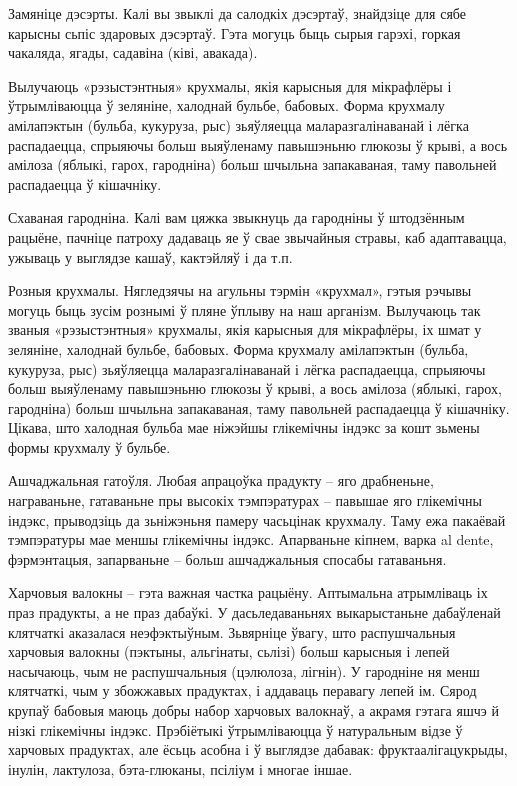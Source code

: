 Замяніце дэсэрты.
Калі вы звыклі да салодкіх дэсэртаў, знайдзіце для сябе карысны сьпіс здаровых дэсэртаў. Гэта могуць быць сырыя гарэхі, горкая чакаляда, ягады, садавіна (ківі, авакада).

Вылучаюць «рэзыстэнтныя» крухмалы, якія карысныя для мікрафлёры і ўтрымліваюцца ў зеляніне, халоднай бульбе, бабовых. Форма крухмалу амілапэктын (бульба, кукуруза, рыс) зьяўляецца маларазгалінаванай і лёгка распадаецца, спрыяючы больш выяўленаму павышэньню глюкозы ў крыві, а вось амілоза (яблыкі, гарох, гародніна) больш шчыльна запакаваная, таму павольней распадаецца ў кішачніку.

Схаваная гародніна.
Калі вам цяжка звыкнуць да гародніны ў штодзённым рацыёне, пачніце патроху дадаваць яе ў свае звычайныя стравы, каб адаптавацца, ужываць у выглядзе кашаў, кактэйляў і да т.п.

Розныя крухмалы.
Нягледзячы на агульны тэрмін «крухмал», гэтыя рэчывы могуць быць зусім рознымі ў пляне ўплыву на наш арганізм. Вылучаюць так званыя «рэзыстэнтныя» крухмалы, якія карысныя для мікрафлёры, іх шмат у зеляніне, халоднай бульбе, бабовых. Форма крухмалу амілапэктын (бульба, кукуруза, рыс) зьяўляецца маларазгалінаванай і лёгка распадаецца, спрыяючы больш выяўленаму павышэньню глюкозы ў крыві, а вось амілоза (яблыкі, гарох, гародніна) больш шчыльна запакаваная, таму павольней распадаецца ў кішачніку. Цікава, што халодная бульба мае ніжэйшы глікемічны індэкс за кошт зьмены формы крухмалу ў бульбе.

Ашчаджальная гатоўля.
Любая апрацоўка прадукту – яго драбненьне, награваньне, гатаваньне пры высокіх тэмпэратурах – павышае яго глікемічны індэкс, прыводзіць да зьніжэньня памеру часьцінак крухмалу. Таму ежа пакаёвай тэмпэратуры мае меншы глікемічны індэкс. Апарваньне кіпнем, варка al dente, фэрмэнтацыя, запарваньне – больш ашчаджальныя спосабы гатаваньня.

Харчовыя валокны – гэта важная частка рацыёну.
Аптымальна атрымліваць іх праз прадукты, а не праз дабаўкі. У дасьледаваньнях выкарыстаньне дабаўленай клятчаткі аказалася неэфэктыўным. Зьвярніце ўвагу, што распушчальныя харчовыя валокны (пэктыны, альгінаты, сьлізі) больш карысныя і лепей насычаюць, чым не распушчальныя (цэлюлоза, лігнін). У гародніне ня менш клятчаткі, чым у збожжавых прадуктах, і аддаваць перавагу лепей ім. Сярод крупаў бабовыя маюць добры набор харчовых валокнаў, а акрамя гэтага яшчэ й нізкі глікемічны індэкс. Прэбіётыкі ўтрымліваюцца ў натуральным відзе ў харчовых прадуктах, але ёсьць асобна і ў выглядзе дабавак: фруктаалігацукрыды, інулін, лактулоза, бэта-глюканы, псіліум і многае іншае.

